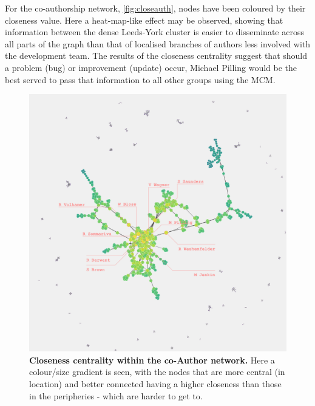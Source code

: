 For the co-authorship network, \autoref{fig:closeauth}, nodes have been coloured by their closeness value. Here a heat-map-like effect may be observed, showing that information between the dense Leeds-York cluster is easier to disseminate across all parts of the graph than that of localised branches of authors less involved with the development team. The results of the closeness centrality suggest that should a problem (bug) or improvement (update) occur, Michael Pilling would be the best served to pass that information to all other groups using the MCM. 

\begin{figure}[H]
     \centering
         \includegraphics[width=.8\textwidth]{figures_c3/closenessauthor.png}
         
         
        \caption{ \textbf{Closeness centrality within the co-Author network.} Here a colour/size gradient is seen, with the nodes that are more central (in location) and better connected having a higher closeness than those in the peripheries - which are harder to get to.}
        \label{fig:closeauth}
\end{figure}
% 
% 
% 
